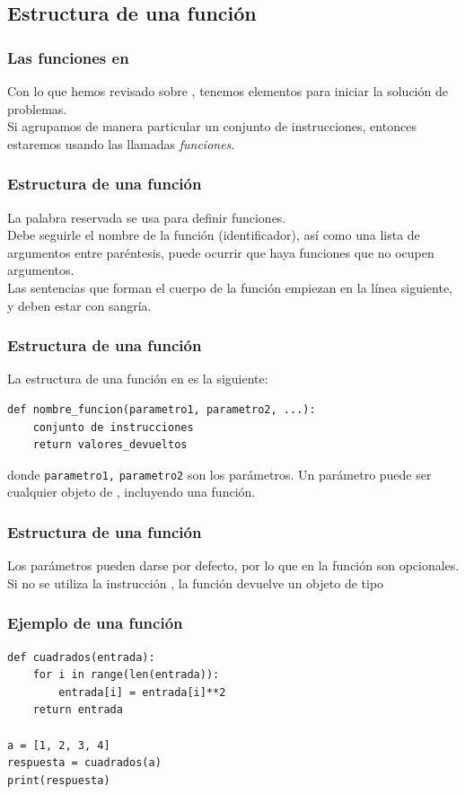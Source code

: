 \subsection{Estructura de una función}
\begin{frame}
\frametitle{Las funciones en \python}
Con lo que hemos revisado sobre \python, tenemos elementos para iniciar la solución de problemas.
\\
\bigskip
Si agrupamos de manera particular un conjunto de instrucciones, entonces estaremos usando las llamadas \emph{funciones}.
\end{frame}
\begin{frame}[fragile]
\frametitle{Estructura de una función}
La palabra reservada  se usa para definir funciones. 
\\
\bigskip
 Debe seguirle el nombre de la función (identificador), así como una lista de argumentos entre paréntesis, puede ocurrir que haya funciones que no ocupen argumentos.
 \\
\bigskip
Las sentencias que forman el cuerpo de la función empiezan en la línea siguiente, y deben estar con sangría.
\end{frame}
\begin{frame}[fragile]
\frametitle{Estructura de una función}
La estructura de una función en \python{} es la siguiente:
\fontsize{12}{12}\selectfont
\begin{lstlisting}
def nombre_funcion(parametro1, parametro2, ...):
    conjunto de instrucciones
    return valores_devueltos
\end{lstlisting}
donde \texttt{parametro1,} \texttt{parametro2} son los parámetros. Un parámetro puede ser cualquier objeto de \python, incluyendo una función.
\end{frame}
\begin{frame}
\frametitle{Estructura de una función}
Los parámetros pueden darse por defecto, por lo que en la función son opcionales. 
\\
\bigskip
Si no se utiliza la instrucción , la función devuelve un objeto de tipo 
\end{frame}
\begin{frame}[fragile]
\frametitle{Ejemplo de una función}
\begin{lstlisting}[style=codigopython]
def cuadrados(entrada):
    for i in range(len(entrada)):
        entrada[i] = entrada[i]**2
    return entrada

a = [1, 2, 3, 4]
respuesta = cuadrados(a)
print(respuesta)
\end{lstlisting}
\end{frame}
